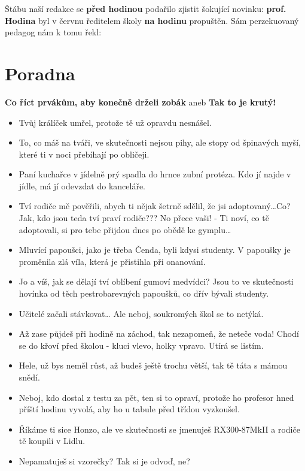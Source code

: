 \documentclass[twoside, 11pt]{article}
\begin{document}
Štábu naší redakce se \textbf{před hodinou} podařilo zjistit šokující novinku:
\textbf{prof. Hodina} byl v červnu ředitelem školy \textbf{na hodinu} propuštěn.
Sám perzekuovaný pedagog nám k tomu řekl: 

\section*{Poradna}
\vspace*{-12pt}
\textbf{Co říct prvákům, aby konečně drželi zobák} aneb \textbf{Tak to je krutý!}
  
\begin{itemize}
    \item Tvůj králíček umřel, protože tě už opravdu nesnášel.
    \item To, co máš na tváři, ve skutečnosti nejsou pihy, ale stopy od špinavých myší, které ti v noci přebíhají po obličeji.
    \item Paní kuchařce v jídelně prý spadla do hrnce zubní protéza. Kdo jí najde v jídle, má jí
    odevzdat do kanceláře.
    \item Tví rodiče mě pověřili, abych ti nějak šetrně sdělil, že jsi adoptovaný\dots Co? Jak, kdo jsou
    teda tví praví rodiče??? No přece vaši! - Ti noví, co tě adoptovali, si pro tebe přijdou dnes
    po obědě ke gymplu\dots
    \item Mluvící papoušci, jako je třeba Čenda, byli kdysi studenty.
    V papoušky je proměnila zlá víla, která je přistihla při
    onanování.
    \item Jo a víš, jak se dělají tví oblíbení gumoví medvídci? Jsou
    to ve skutečnosti hovínka od těch pestrobarevných
    papoušků, co dřív bývali studenty.
    \item Učitelé začali stávkovat\dots \- Ale neboj, soukromých škol se
    to netýká.
    \item Až zase půjdeš při hodině na záchod, tak nezapomeň, že neteče voda! Chodí se do křoví
    před školou - kluci vlevo, holky vpravo. Utírá se listím.
    \item Hele, už bys neměl růst, až budeš ještě trochu větší, tak tě táta s mámou snědí.
    \item Neboj, kdo dostal z testu za pět, ten si to opraví, protože ho profesor hned příští hodinu
    vyvolá, aby ho u tabule před třídou vyzkoušel.
    \item Říkáme ti sice Honzo, ale ve skutečnosti se jmenuješ RX300-87MkII a rodiče tě koupili
    v Lidlu.
    \item Nepamatuješ si vzorečky? Tak si je odvoď, ne?
\end{itemize}
\end{document}
